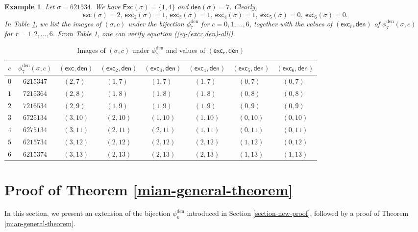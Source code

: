 \documentclass[12pt]{article}
\newtheorem{example}{Example}[section]
\begin{document}
\begin{example}
\emph{
Let $\sigma=621534$.
We have $\textsf{Exc}(\sigma)=\{1,4\}$ and $\textsf{den}(\sigma)=7$. 
Clearly,
$$\textsf{exc}(\sigma)=2,\!~
\textsf{exc}_{2}(\sigma)=1,\!~
\textsf{exc}_{3}(\sigma)=1,\!~
\textsf{exc}_{4}(\sigma)=1,\!~
\textsf{exc}_{5}(\sigma)=0,\!~
\textsf{exc}_{6}(\sigma)=0.$$
In Table \ref{Table-1}, 
we list the images of $(\sigma,c)$ under the bijection $\phi_{7}^{\text{den}}$ for $c=0,1,\ldots,6$,
together with the values of $(\textsf{exc}_{r},\textsf{den})$ of $\phi_{7}^{\text{den}}(\sigma,c)$ for $r=1,2,\ldots,6$.
From Table \ref{Table-1}, one can verify equation (\ref{eq-(excr,den)-all}).
}\end{example}
\begin{table}[t]
	\centering
	\caption{Images of $(\sigma,c)$ under $\phi_{7}^{\text{den}}$ and values of $(\textsf{exc}_{r},\textsf{den})$}\label{Table-1}	
	\begin{tabular}{c|c|c|c|c|c|c|c}
			$c$
			&$\phi_{7}^{\text{den}}(\sigma,c)$
			&$(\textsf{exc},\textsf{den})$
			&$(\textsf{exc}_{2},\textsf{den})$
			&$(\textsf{exc}_{3},\textsf{den})$
			&$(\textsf{exc}_{4},\textsf{den})$
			&$(\textsf{exc}_{5},\textsf{den})$
			&$(\textsf{exc}_{6},\textsf{den})$
			\\
			\hline
			$0$&$6215347$&$(2,7)~\!~$&$(1,7)~\!~$&$(1,7)~\!~$&$(1,7)~\!~$&$(0,7)~\!~$&$(0,7)~\!~$ \\
			$1$&$7215364$&$(2,8)~\!~$&$(1,8)~\!~$&$(1,8)~\!~$&$(1,8)~\!~$&$(0,8)~\!~$&$(0,8)~\!~$  \\
			$2$&$7216534$&$(2,9)~\!~$&$(1,9)~\!~$&$(1,9)~\!~$&$(1,9)~\!~$&$(0,9)~\!~$&$(0,9)~\!~$ \\
			$3$&$6725134$&$(3,10)$&$(2,10)$&$(1,10)$&$(1,10)$&$(0,10)$&$(0,10)$ \\ 
			$4$&$6275134$&$(3,11)$&$(2,11)$&$(2,11)$&$(1,11)$&$(0,11)$&$(0,11)$    \\
			$5$&$6215734$&$(3,12)$&$(2,12)$&$(2,12)$&$(2,12)$&$(1,12)$&$(0,12)$    \\
			$6$&$6215374$&$(3,13)$&$(2,13)$&$(2,13)$&$(2,13)$&$(1,13)$&$(1,13)$    \\
		\end{tabular}
\end{table} 
\section{Proof of Theorem \ref{mian-general-theorem}}\label{Proof of Theorem 1.4}
In this section, we present an extension of the bijection 
$\phi_{n}^{\text{den}}$ introduced in Section \ref{section-new-proof},
followed by a proof of Theorem \ref{mian-general-theorem}.
\end{document}
